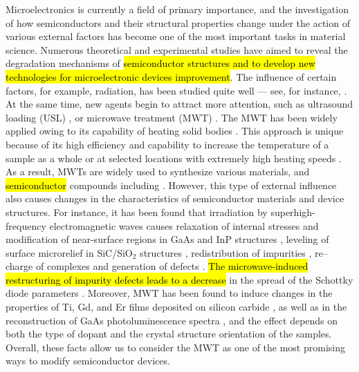 \documentclass[10pt]{iopart}
\begin{document}
Microelectronics is currently a field of primary importance, and  the investigation of how semiconductors and their structural properties change under the action of various external factors has become one of the most important tasks in material science.
Numerous theoretical and experimental studies have aimed to reveal the degradation mechanisms of
\hl{semiconductor structures and to develop new technologies for microelectronic devices improvement}.
The influence of certain factors, for example, radiation, has been studied quite well --- see, for instance, \cite{KozlovsEn,RadiationEffectsBook,DefByIon}.
At the same time, new agents begin to attract more attention, such as ultrasound loading (USL) \cite{Olikh2018JAP,Olikh2006TPL},
or microwave treatment (MWT) \cite{MW:Rev,ZOHM2000,BHUNIA1998,Bacherikov2003En,Pashkov1994En,
BoltovetsEn,Milenin1994En,BelyaevIntac,ASHKINADZE1996,ProcSPIE,Belyaev1998JTFEn,
Bacherikov2008En,Konakova2015En,Konakova2012FTPEn}.
The MWT has been widely applied owing to its capability of heating solid bodies \cite{MW:Rev,ZOHM2000}.
This approach is unique because of its high efficiency and capability to increase the temperature
of a sample as a whole or at selected locations with extremely high heating speeds \cite{MW:Rev}.
As a result, MWTs are widely used to synthesize various materials, and \hl{semiconductor} compounds including \cite{MW:Rev,BHUNIA1998}.
However, this type of external influence also causes changes in the  characteristics of semiconductor materials and device structures.
For instance, it has been found that irradiation by superhigh-frequency electromagnetic waves causes relaxation of internal stresses and modification of near-surface regions
in GaAs and InP structures \cite{BoltovetsEn,Pashkov1994En,Milenin1994En,BelyaevIntac,ProcSPIE,Konakova2015En,Konakova2012FTPEn},
leveling of surface microrelief in SiC/SiO$_2$ structures \cite{Bacherikov2003En},
redistribution of impurities \cite{Bacherikov2003En,Belyaev1998JTFEn,Konakova2015En},
re--charge of complexes \cite{Milenin1994En}
and generation of defects \cite{Belyaev1998JTFEn}.
\hl{The microwave-induced restructuring of impurity defects leads to
a decrease} in the spread of the Schottky diode parameters \cite{Milenin1994En,Belyaev1998JTFEn}.
Moreover, MWT has been found to induce changes in the properties of Ti, Gd, and Er films deposited on silicon carbide \cite{Bacherikov2008En},
as well as in the reconstruction of GaAs photoluminescence spectra \cite{BelyaevIntac,ProcSPIE,Belyaev1998JTFEn},
and the effect depends on both the type of dopant and the crystal structure orientation of the samples.
Overall, these facts allow us to consider the MWT as one of the most promising ways to modify semiconductor devices.
\end{document}
